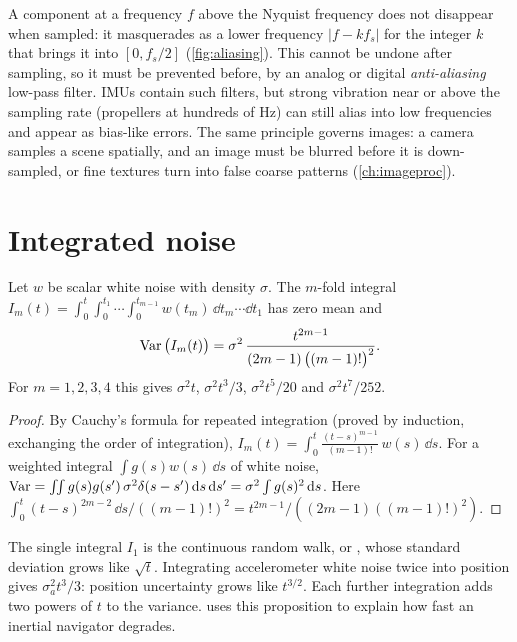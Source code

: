 A component at a frequency $f$ above the Nyquist frequency does not disappear when sampled: it masquerades as a lower frequency
$|f - kf_s|$ for the integer $k$ that brings it into $[0, f_s/2]$ (\cref{fig:aliasing}). This  cannot be undone after sampling, so it
must be prevented before, by an analog or digital \emph{anti-aliasing} low-pass filter. IMUs contain such filters, but strong vibration near
or above the sampling rate (propellers at hundreds of Hz) can still alias into low frequencies and appear as bias-like errors. The same
principle governs images: a camera samples a scene spatially, and an image must be blurred before it is down-sampled, or fine textures turn
into false coarse patterns (\cref{ch:imageproc}).

\section{Integrated noise}

\begin{proposition}
\label{prop:integrated-noise}
Let $w$ be scalar white noise with density $\sigma$. The $m$-fold integral
$I_m(t) = \int_0^t \int_0^{t_1}\cdots\int_0^{t_{m-1}} w(t_m)\,\dd t_m \cdots \dd t_1$ has zero mean and
\begin{equation}
  \operatorname{Var}\big(I_m(t)\big) = \sigma^2\,\frac{t^{2m-1}}{(2m-1)\,\big((m-1)!\big)^2}.
  \label{eq:integrated-noise}
\end{equation}
For $m = 1, 2, 3, 4$ this gives $\sigma^2 t$, $\sigma^2 t^3/3$, $\sigma^2 t^5/20$ and $\sigma^2 t^7/252$.
\end{proposition}
\begin{proof}
By Cauchy's formula for repeated integration (proved by induction, exchanging the order of integration),
$I_m(t) = \int_0^t \frac{(t - s)^{m-1}}{(m-1)!}\,w(s)\,\dd s$. For a weighted integral $\int g(s)w(s)\,\dd s$ of white noise,
$\operatorname{Var} = \iint g(s)g(s')\,\sigma^2\delta(s - s')\,\mathrm{d} s\,\mathrm{d} s' = \sigma^2\int g(s)^2\,\mathrm{d} s$. Here
$\int_0^t (t-s)^{2m-2}\,\dd s/((m-1)!)^2 = t^{2m-1}/((2m-1)((m-1)!)^2)$.
\end{proof}

The single integral $I_1$ is the continuous random walk, or , whose standard deviation grows like $\sqrt t$. Integrating
accelerometer white noise twice into position gives $\sigma_a^2t^3/3$: position uncertainty grows like $t^{3/2}$. Each further integration adds
two powers of $t$ to the variance.  uses this proposition to explain how fast an inertial navigator degrades.

